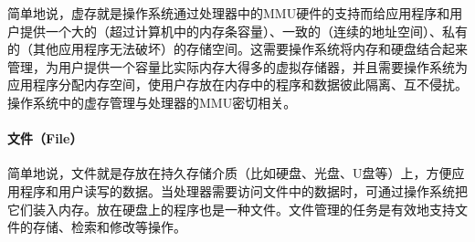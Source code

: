 简单地说，虚存就是操作系统通过处理器中的MMU硬件的支持而给应用程序和用户提供一个大的（超过计算机中的内存条容量）、一致的（连续的地址空间）、私有的（其他应用程序无法破坏）的存储空间。这需要操作系统将内存和硬盘结合起来管理，为用户提供一个容量比实际内存大得多的虚拟存储器，并且需要操作系统为应用程序分配内存空间，使用户存放在内存中的程序和数据彼此隔离、互不侵扰。操作系统中的虚存管理与处理器的MMU密切相关。

\paragraph{文件（File）}

简单地说，文件就是存放在持久存储介质（比如硬盘、光盘、U盘等）上，方便应用程序和用户读写的数据。当处理器需要访问文件中的数据时，可通过操作系统把它们装入内存。放在硬盘上的程序也是一种文件。文件管理的任务是有效地支持文件的存储、检索和修改等操作。
